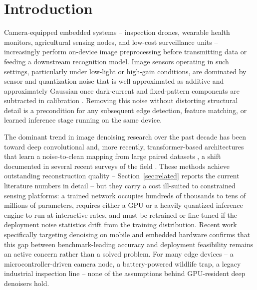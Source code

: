 \documentclass[final,3p,times,twocolumn,nopreprintline]{elsarticle}
\begin{document}
\section{Introduction}
\label{sec:intro}

Camera-equipped embedded systems -- inspection drones, wearable health monitors, agricultural sensing nodes, and low-cost surveillance units -- increasingly perform on-device image preprocessing before transmitting data or feeding a downstream recognition model. Image sensors operating in such settings, particularly under low-light or high-gain conditions, are dominated by sensor and quantization noise that is well approximated as additive and approximately Gaussian once dark-current and fixed-pattern components are subtracted in calibration \cite{tian2020image}. Removing this noise without distorting structural detail is a precondition for any subsequent edge detection, feature matching, or learned inference stage running on the same device.

The dominant trend in image denoising research over the past decade has been toward deep convolutional and, more recently, transformer-based architectures that learn a noise-to-clean mapping from large paired datasets \cite{zhang2017beyond,zhang2018ffdnet,zhang2021plug,liang2021swinir,zamir2022restormer}, a shift documented in several recent surveys of the field \cite{fan2019brief,tian2020deep}. These methods achieve outstanding reconstruction quality -- Section~\ref{sec:related} reports the current literature numbers in detail -- but they carry a cost ill-suited to constrained sensing platforms: a trained network occupies hundreds of thousands to tens of millions of parameters, requires either a GPU or a heavily quantized inference engine to run at interactive rates, and must be retrained or fine-tuned if the deployment noise statistics drift from the training distribution. Recent work specifically targeting denoising on mobile and embedded hardware \cite{liu2023lightweight,bled2024lightweight,ayazoglu2021extremely} confirms that this gap between benchmark-leading accuracy and deployment feasibility remains an active concern rather than a solved problem. For many edge devices -- a microcontroller-driven camera node, a battery-powered wildlife trap, a legacy industrial inspection line -- none of the assumptions behind GPU-resident deep denoisers hold.
\end{document}
